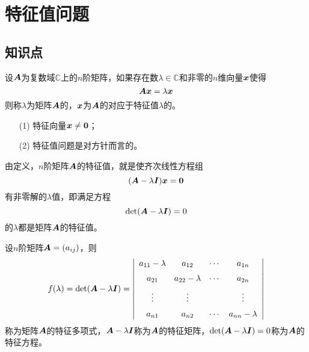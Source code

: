 \section{特征值问题}

\subsection{知识点}


\begin{frame}
  
  \begin{dingyi}[特征值与特征向量]
    设$\boldsymbol{A}$为复数域$\mathbb C$上的$n$阶矩阵，如果存在数$\lambda\in\mathbb C$和非零的$n$维向量${\boldsymbol{x}}$使得
    $$
    \boldsymbol{A}{\boldsymbol{x}}=\lambda{\boldsymbol{x}}
    $$
    则称$\lambda$为矩阵$\boldsymbol{A}$的，${\boldsymbol{x}}$为$\boldsymbol{A}$的对应于特征值$\lambda$的。
  \end{dingyi}  

  \begin{itemize}
  \item[(1)] 特征向量$\vx\ne\M0$；
  \item[(2)] 特征值问题是对方针而言的。 
  \end{itemize}
  
\end{frame}


\begin{frame}
  
  由定义，$n$阶矩阵$\boldsymbol{A}$的特征值，就是使齐次线性方程组
  $$
  (\MA-\lambda\MI)\vx=\M0
  $$
  有非零解的$\lambda$值，即满足方程
  $$
  \mathrm{det}(\boldsymbol{A}-\lambda\boldsymbol{I})=0
  $$
  的$\lambda$都是矩阵$\boldsymbol{A}$的特征值。


  
  
\end{frame}


\begin{frame}
  
  \begin{dingyi}
    设$n$阶矩阵$\boldsymbol{A}=(a_{ij})$，则
    $$
    f(\lambda)=\mathrm{det}(\boldsymbol{A}-\lambda\boldsymbol{I})
    =\left|
      \begin{array}{cccc}
        a_{11}- \lambda&a_{12}&\cdots&a_{1n}\\[0.2cm]
        a_{21}&a_{22}-\lambda&\cdots&a_{2n}\\[0.2cm]
        \vdots&\vdots&&\vdots\\[0.2cm]
        a_{n1}&a_{n2}&\cdots&a_{nn}-\lambda
      \end{array}
    \right|
    $$
    称为矩阵$\boldsymbol{A}$的特征多项式，$\boldsymbol{A}-\lambda\boldsymbol{I}$称为$\boldsymbol{A}$的特征矩阵，$\mathrm{det}(\boldsymbol{A}-\lambda\boldsymbol{I})=0$称为$\boldsymbol{A}$的特征方程。
  \end{dingyi}
  
  
\end{frame}

